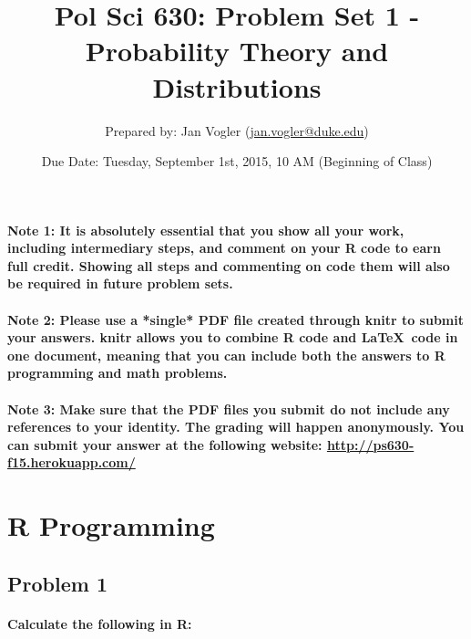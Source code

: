 \documentclass[12pt,letter]{article}
\begin{document}
\title{Pol Sci 630: Problem Set 1 - Probability Theory and Distributions}

\author{Prepared by: Jan Vogler (\href{mailto:jan.vogler@duke.edu}{jan.vogler@duke.edu})}

\date{Due Date: Tuesday, September 1st, 2015, 10 AM (Beginning of Class)}
 
\maketitle 



\paragraph{Note 1: It is absolutely essential that you show all your work, including intermediary steps, and comment on your R code to earn full credit. Showing all steps and commenting on code them will also be required in future problem sets.}

\paragraph{Note 2: Please use a *single* PDF file created through knitr to submit your answers. knitr allows you to combine R code and \LaTeX \ code in one document, meaning that you can include both the answers to R programming and math problems.}

\paragraph{Note 3: Make sure that the PDF files you submit do not include any references to your identity. The grading will happen anonymously. You can submit your answer at the following website: \url{http://ps630-f15.herokuapp.com/}}



\section*{R Programming}

\subsection*{Problem 1}

\paragraph{Calculate the following in R:}
\end{document}
